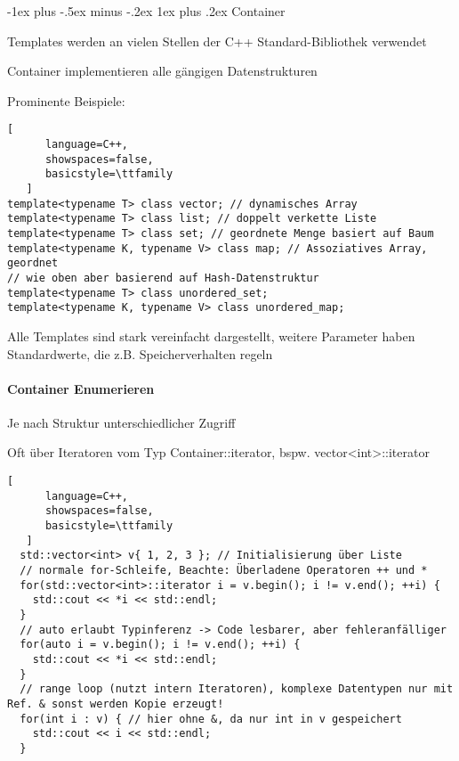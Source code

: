 \documentclass[10pt]{article}
\makeatletter
\renewcommand{\subsubsection}{\@startsection{subsubsection}{3}{0mm}%
                                {-1ex plus -.5ex minus -.2ex}%
                                {1ex plus .2ex}%
                                {\normalfont\small\bfseries}}
\makeatother
\begin{document}
\subsubsection{Container}
\begin{itemize*}
  \item Templates werden an vielen Stellen der C++ Standard-Bibliothek verwendet
  \item Container implementieren alle gängigen Datenstrukturen
  \item Prominente Beispiele:
  \begin{lstlisting}[
      language=C++,
      showspaces=false,
      basicstyle=\ttfamily
   ]
template<typename T> class vector; // dynamisches Array
template<typename T> class list; // doppelt verkette Liste
template<typename T> class set; // geordnete Menge basiert auf Baum
template<typename K, typename V> class map; // Assoziatives Array, geordnet
// wie oben aber basierend auf Hash-Datenstruktur
template<typename T> class unordered_set;
template<typename K, typename V> class unordered_map;
\end{lstlisting}
  
  \item Alle Templates sind stark vereinfacht dargestellt, weitere Parameter haben Standardwerte, die z.B. Speicherverhalten regeln
\end{itemize*}

\paragraph{Container Enumerieren}
\begin{itemize*}
  \item Je nach Struktur unterschiedlicher Zugriff
  \item Oft über Iteratoren vom Typ Container::iterator, bspw. vector<int>::iterator
\end{itemize*}
\begin{lstlisting}[
      language=C++,
      showspaces=false,
      basicstyle=\ttfamily
   ]
  std::vector<int> v{ 1, 2, 3 }; // Initialisierung über Liste
  // normale for-Schleife, Beachte: Überladene Operatoren ++ und *
  for(std::vector<int>::iterator i = v.begin(); i != v.end(); ++i) {
    std::cout << *i << std::endl;
  }
  // auto erlaubt Typinferenz -> Code lesbarer, aber fehleranfälliger
  for(auto i = v.begin(); i != v.end(); ++i) {
    std::cout << *i << std::endl;
  }
  // range loop (nutzt intern Iteratoren), komplexe Datentypen nur mit Ref. & sonst werden Kopie erzeugt!
  for(int i : v) { // hier ohne &, da nur int in v gespeichert
    std::cout << i << std::endl;
  }
  \end{lstlisting}
\end{document}
